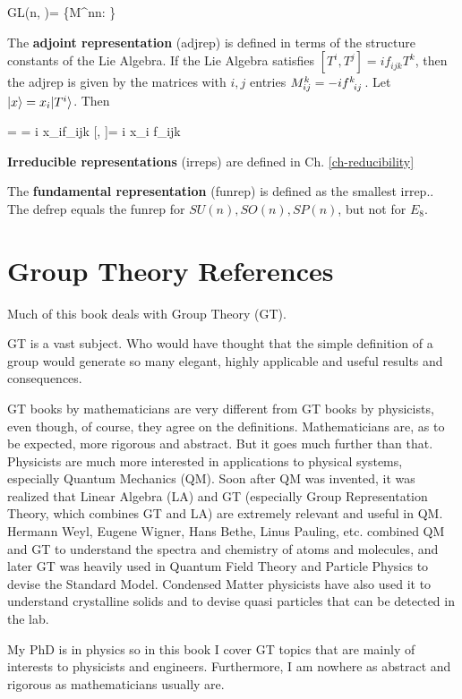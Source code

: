 \beq
GL(n, \CC)=
\{M\in \CC^{n\times n}: \}
\eeq

The {\bf adjoint representation} (adjrep)
is defined in terms of the structure constants
of the Lie Algebra. If the Lie Algebra satisfies
$[T^i, T^j]= if_{ijk}T^k$,
then the adjrep is given by the matrices 
with $i,j$ entries $M^k_{ij}=-if\indices{^k_i_j}$.
Let  $|x\rangle = x_i |T^i\rangle$.
Then

   = 
\ket{[x, T^j]}= i x_if_{ijk} \implies
{}[, \cdot]= 
i x_i f_{ijk}
\eeq


{\bf Irreducible representations} (irreps)
are defined in Ch. \ref{ch-reducibility}

The {\bf fundamental representation} (funrep)
is defined as the smallest irrep.. 
The defrep equals the funrep for
$SU(n), SO(n), SP(n)$, but not for $E_8$.



\section{Group Theory References}
Much of this book
deals with Group Theory (GT).


GT is a vast subject. Who would have thought
that the simple definition of 
a group would generate so many elegant, highly applicable and useful results and
consequences.

GT books by mathematicians are very
different from GT
books by physicists,
even though, of course,
they agree on the definitions. 
Mathematicians
are, as to be expected, more rigorous and abstract. But it goes much further than that. Physicists are much
more interested in applications
to physical systems,
especially Quantum Mechanics (QM).
Soon after QM was invented,
it was realized that Linear Algebra (LA) and GT  (especially Group Representation Theory,
which combines GT and LA)
are extremely
relevant and useful in QM.
Hermann Weyl,
Eugene Wigner, Hans Bethe, Linus Pauling, etc.
combined QM and GT to understand the spectra and chemistry of atoms and molecules,
and later GT was heavily used in Quantum Field Theory and Particle Physics to devise 
the Standard Model. Condensed Matter physicists have also used it to understand crystalline solids and to devise quasi particles that can be detected in the lab. 

My PhD is in physics
so in this book I cover 
GT topics that are  mainly of interests to
physicists and engineers. Furthermore,
I am nowhere as abstract and
rigorous as mathematicians 
usually are.

